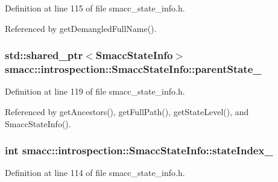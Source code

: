 Definition at line 115 of file smacc\+\_\+state\+\_\+info.\+h.



Referenced by get\+Demangled\+Full\+Name().

\subsubsection[{\texorpdfstring{parent\+State\+\_\+}{parentState_}}]{\setlength{\rightskip}{0pt plus 5cm}std\+::shared\+\_\+ptr$<${\bf Smacc\+State\+Info}$>$ smacc\+::introspection\+::\+Smacc\+State\+Info\+::parent\+State\+\_\+}\hypertarget{classsmacc_1_1introspection_1_1SmaccStateInfo_afa49a141d2ccdb3d6f9676ed380ce006}{}\label{classsmacc_1_1introspection_1_1SmaccStateInfo_afa49a141d2ccdb3d6f9676ed380ce006}


Definition at line 119 of file smacc\+\_\+state\+\_\+info.\+h.



Referenced by get\+Ancestors(), get\+Full\+Path(), get\+State\+Level(), and Smacc\+State\+Info().

\subsubsection[{\texorpdfstring{state\+Index\+\_\+}{stateIndex_}}]{\setlength{\rightskip}{0pt plus 5cm}int smacc\+::introspection\+::\+Smacc\+State\+Info\+::state\+Index\+\_\+}\hypertarget{classsmacc_1_1introspection_1_1SmaccStateInfo_a2354fa7abf158f0c29ab71c3125c9801}{}\label{classsmacc_1_1introspection_1_1SmaccStateInfo_a2354fa7abf158f0c29ab71c3125c9801}


Definition at line 114 of file smacc\+\_\+state\+\_\+info.\+h.

